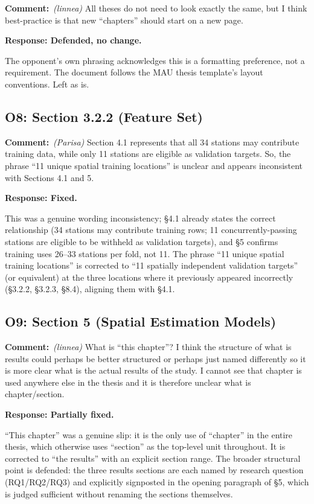 \documentclass[11pt,a4paper]{article}
\newcommand{\rjcomment}[1]{\par\noindent\textbf{Comment:}\ #1\par}
\newcommand{\rjresponse}[1]{\par\noindent\textbf{Response: #1}\par}
\begin{document}
\rjcomment{\emph{(linnea)} All theses do not need to look exactly the same, but I think
best-practice is that new ``chapters'' should start on a new page.}

\rjresponse{Defended, no change.}
The opponent's own phrasing acknowledges this is a formatting preference, not a requirement. The
document follows the MAU thesis template's layout conventions. Left as is.

\subsection{O8: Section 3.2.2 (Feature Set)}

\rjcomment{\emph{(Parisa)} Section 4.1 represents that all 34 stations may contribute training
data, while only 11 stations are eligible as validation targets. So, the phrase ``11 unique
spatial training locations'' is unclear and appears inconsistent with Sections 4.1 and 5.}

\rjresponse{Fixed.}
This was a genuine wording inconsistency; \S4.1 already states the correct relationship (34
stations may contribute training rows; 11 concurrently-passing stations are eligible to be
withheld as validation targets), and \S5 confirms training uses 26--33 stations per fold, not
11. The phrase ``11 unique spatial training locations'' is corrected to ``11 spatially
independent validation targets'' (or equivalent) at the three locations where it previously
appeared incorrectly (\S3.2.2, \S3.2.3, \S8.4), aligning them with \S4.1.

\subsection{O9: Section 5 (Spatial Estimation Models)}

\rjcomment{\emph{(linnea)} What is ``this chapter''? I think the structure of what is results
could perhaps be better structured or perhaps just named differently so it is more clear what is
the actual results of the study. I cannot see that chapter is used anywhere else in the thesis
and it is therefore unclear what is chapter/section.}

\rjresponse{Partially fixed.}
``This chapter'' was a genuine slip: it is the only use of ``chapter'' in the entire thesis,
which otherwise uses ``section'' as the top-level unit throughout. It is corrected to ``the
results'' with an explicit section range. The broader structural point is defended: the three
results sections are each named by research question (RQ1/RQ2/RQ3) and explicitly signposted in
the opening paragraph of \S5, which is judged sufficient without renaming the sections
themselves.
\end{document}
